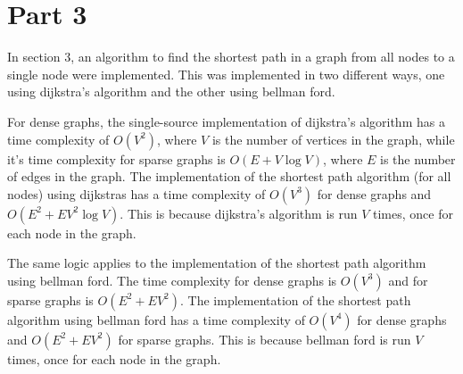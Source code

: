 \documentclass[12pt]{article}
\begin{document}
\section*{Part 3}
In section 3, an algorithm to find the shortest path in a graph from all nodes to a single node were implemented. 
This was implemented in two different ways, one using dijkstra's algorithm and the other using bellman ford.

\smallskip
For dense graphs, the single-source implementation of dijkstra's algorithm has a time complexity of $O(V^2)$,
where $V$ is the number of vertices in the graph, while it's time complexity for sparse graphs is $O(E + V \log V)$, where $E$ is the number of edges in the graph.
The implementation of the shortest path algorithm (for all nodes) using dijkstras has a time complexity of 
$O(V^3)$ for dense graphs and $O(E^2 + EV^2 \log V)$. This is because dijkstra's algorithm is run $V$ times, once for each node in the graph.

\smallskip
The same logic applies to the implementation of the shortest path algorithm using bellman ford. The time complexity for dense graphs is $O(V^3)$ and for sparse graphs is $O(E^2 + EV^2)$.
The implementation of the shortest path algorithm using bellman ford has a time complexity of $O(V^4)$ for dense graphs and $O(E^2 + EV^2)$ for sparse graphs. This is because bellman ford is run $V$ times, once for each node in the graph.
\end{document}

